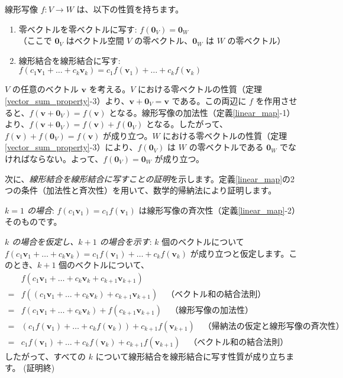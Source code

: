 \begin{thm}[線形写像の性質] \label{linear_map_property}
線形写像 $f: V \to W$ は、以下の性質を持ちます。
\begin{enumerate}
\item 零ベクトルを零ベクトルに写す: $f(\bm{0}_V) = \bm{0}_W$\\
    （ここで $\bm{0}_V$ はベクトル空間 $V$ の零ベクトル、$\bm{0}_W$ は $W$ の零ベクトル）
\item 線形結合を線形結合に写す: $f(c_1\bm{v}_1 + \dots + c_k\bm{v}_k) = c_1 f(\bm{v}_1) + \dots + c_k f(\bm{v}_k)$
\end{enumerate}
\begin{proof*}
$V$ の任意のベクトル $\bm{v}$ を考える。$V$ における零ベクトルの性質（定理\ref{vector_sum_property}-3）より、$\bm{v} + \bm{0}_V = \bm{v}$ である。この両辺に $f$ を作用させると、$f(\bm{v} + \bm{0}_V) = f(\bm{v})$ となる。線形写像の加法性（定義\ref{linear_map}-1）より、$f(\bm{v} + \bm{0}_V) = f(\bm{v}) + f(\bm{0}_V)$ となる。したがって、$f(\bm{v}) + f(\bm{0}_V) = f(\bm{v})$ が成り立つ。$W$ における零ベクトルの性質（定理\ref{vector_sum_property}-3）により、$f(\bm{0}_V)$ は $W$ の零ベクトルである $\bm{0}_W$ でなければならない。よって、$f(\bm{0}_V) = \bm{0}_W$ が成り立つ。\par
次に、\emph{線形結合を線形結合に写すことの証明}を示します。定義\ref{linear_map}の2つの条件（加法性と斉次性）を用いて、数学的帰納法により証明します。\par
\emph{$k=1$ の場合}: $f(c_1\bm{v}_1) = c_1 f(\bm{v}_1)$ は線形写像の斉次性（定義\ref{linear_map}-2）そのものです。\par
\emph{$k$ の場合を仮定し、$k+1$ の場合を示す}: $k$ 個のベクトルについて $f(c_1\bm{v}_1 + \dots + c_k\bm{v}_k) = c_1 f(\bm{v}_1) + \dots + c_k f(\bm{v}_k)$ が成り立つと仮定します。このとき、$k+1$ 個のベクトルについて、
\begin{align*}
&f(c_1\bm{v}_1 + \dots + c_k\bm{v}_k + c_{k+1}\bm{v}_{k+1}) \\
=& f((c_1\bm{v}_1 + \dots + c_k\bm{v}_k) + c_{k+1}\bm{v}_{k+1}) \quad \text{（ベクトル和の結合法則）} \\
=& f(c_1\bm{v}_1 + \dots + c_k\bm{v}_k) + f(c_{k+1}\bm{v}_{k+1}) \quad \text{（線形写像の加法性）} \\
=& (c_1 f(\bm{v}_1) + \dots + c_k f(\bm{v}_k)) + c_{k+1} f(\bm{v}_{k+1}) \quad \text{（帰納法の仮定と線形写像の斉次性）} \\
=& c_1 f(\bm{v}_1) + \dots + c_k f(\bm{v}_k) + c_{k+1} f(\bm{v}_{k+1}) \quad \text{（ベクトル和の結合法則）}
\end{align*}
したがって、すべての $k$ について線形結合を線形結合に写す性質が成り立ちます。
(証明終)
\end{proof*}
\end{thm}

